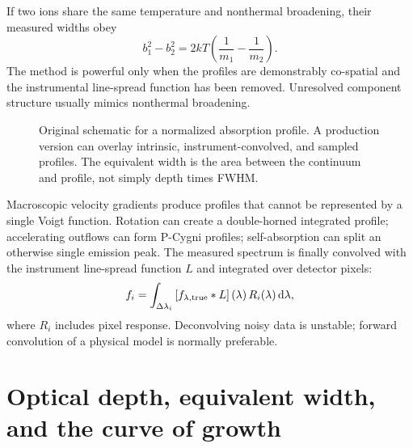 If two ions share the same temperature and nonthermal broadening, their measured
widths obey
\begin{equation}
 b_1^2-b_2^2=2kT\left(\frac{1}{m_1}-\frac{1}{m_2}\right).
 \label{eq:two-ion-temperature}
\end{equation}
The method is powerful only when the profiles are demonstrably co-spatial and the
instrumental line-spread function has been removed.  Unresolved component structure
usually mimics nonthermal broadening.

\begin{figure}[tbp]
\centering
{}
\caption{Original schematic for a normalized absorption profile.  A production
version can overlay intrinsic, instrument-convolved, and sampled profiles.  The
equivalent width is the area between the continuum and profile, not simply depth
times FWHM.}
\label{fig:line-profile-anatomy}
\end{figure}

Macroscopic velocity gradients produce profiles that cannot be represented by a
single Voigt function.  Rotation can create a double-horned integrated profile;
accelerating outflows can form P-Cygni profiles; self-absorption can split an
otherwise single emission peak.  The measured spectrum is finally convolved with
the instrument line-spread function $L$ and integrated over detector pixels:
\begin{equation}
 f_i=\int_{\Delta\lambda_i}
       \left[f_{\lambda,\rm true}*L\right](\lambda)\,
       R_i(\lambda)\,\mathrm{d}\lambda,
 \label{eq:forward-instrument}
\end{equation}
where $R_i$ includes pixel response.  Deconvolving noisy data is unstable; forward
convolution of a physical model is normally preferable.

\section{Optical depth, equivalent width, and the curve of growth}

